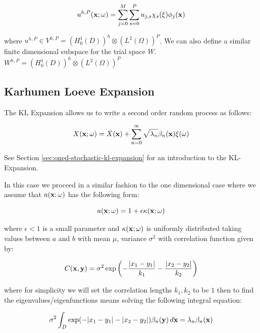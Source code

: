 \begin{equation}\label{eq:twod-stochastic-uhp}
    u^{h,P}(\mathbf{x};\omega) = \sum_{j=0}^M\sum_{s=0}^Pu_{j,s}
        \chi_s(\xi)\phi_j(\mathbf{x})
\end{equation}

where $u^{h,P} \in V^{h,P} = (H^1_0(D))^h \otimes (L^2(\Omega))^P$. We can also
define a similar finite dimensional subspace for the trial space $W$.
$W^{h,P} = (H^1_0(D))^h \otimes (L^2(\Omega))^P$


\subsection{Karhumen Loeve Expansion}\label{sec:twod-stochastic-kl-expand}

The KL Expansion allows us to write a second order random process as follows:

\begin{equation}
    X(\mathbf{x};\omega) = \bar{X}(\mathbf{x}) +
        \sum_{n=0}^\infty\sqrt{\lambda_n}\beta_n(\mathbf{x})\xi(\omega)
\end{equation}

See Section \ref{sec:oned-stochastic-kl-expansion} for an introduction to the
KL-Expansion.

In this case we proceed in a similar fashion to the one dimensional case where
we assume that $a(\mathbf{x};\omega)$ has the following form:

\begin{equation}
    a(\mathbf{x};\omega) = 1 + \epsilon\kappa(\mathbf{x};\omega)
\end{equation}

where $\epsilon < 1$ is a small parameter and $\kappa(\mathbf{x};\omega)$ is
uniformly distributed taking values between $a$ and $b$ with mean $\mu$,
variance $\sigma^2$ with correlation function given by:

\begin{equation}
    C(\mathbf{x}, \mathbf{y}) =
        \sigma^2\exp{\left(-\frac{|x_1 - y_1|}{k_1} - \frac{|x_2 - y_2|}{k_2}\right)}
\end{equation}

where for simplicity we will set the correlation lengths $k_1, k_2$ to be $1$
then to find the eigenvalues/eigenfunctions means solving the following
integral equation:

\begin{equation}\label{eq:twod-stochastic-kl-eigenvalue-problem}
    \sigma^2\int_D\exp(-|x_1 - y_1| - |x_2 - y_2|)\beta_n(\mathbf{y})\, d\mathbf{x}
        = \lambda_n\beta_n(\mathbf{x})
\end{equation}

